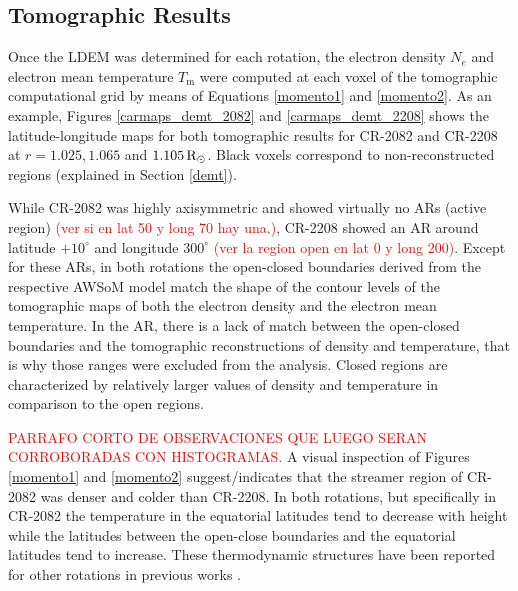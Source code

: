 \documentclass[namedreferences]{solarphysics}
\newcommand{\mdeg}{^\circ}
\newcommand{\mrsun}{{\rm R_\odot}}
\begin{document}
\begin{article}
\subsection{Tomographic Results}\label{demt_res} 

Once the LDEM was determined for each rotation, the electron density $N_e$ and electron mean temperature $T_\textrm{m}$ were computed at each voxel of the tomographic computational grid by means of Equations \ref{momento1} and \ref{momento2}. As an example, Figures \ref{carmaps_demt_2082} and \ref{carmaps_demt_2208} shows the latitude-longitude maps for both tomographic results for CR-2082 and CR-2208 at $r=1.025, 1.065$ and $1.105\,\mrsun$. Black voxels correspond to non-reconstructed regions (explained in Section \ref{demt}).


While CR-2082 was highly axisymmetric and showed virtually no ARs (active region) \textcolor{red}{(ver si en lat 50 y long 70 hay una.)}, CR-2208 showed an AR around latitude $+10\mdeg$ and longitude $300\mdeg$ \textcolor{red}{(ver la region open en lat 0 y long 200)}. Except for these ARs, in both rotations the open-closed boundaries derived from the respective AWSoM model match the shape of the contour levels of the tomographic maps of both the electron density and the electron mean temperature. In the AR, there is a lack of match between the open-closed boundaries and the tomographic reconstructions of density and temperature, that is why those ranges were excluded from the analysis. Closed regions are characterized by relatively larger values of density and temperature in comparison to the open regions.

\textcolor{red}{PARRAFO CORTO DE OBSERVACIONES QUE LUEGO SERAN CORROBORADAS CON HISTOGRAMAS.}
A visual inspection of Figures \ref{momento1} and \ref{momento2} suggest/indicates that the streamer region of CR-2082 was denser and colder than CR-2208. In both rotations, but specifically in CR-2082 the temperature in the equatorial latitudes tend to decrease with height while the latitudes between the open-close boundaries and the equatorial latitudes tend to increase. These thermodynamic structures have been reported for other rotations in previous works \citep{lloveras_2017}.



\end{article}
\end{document}
